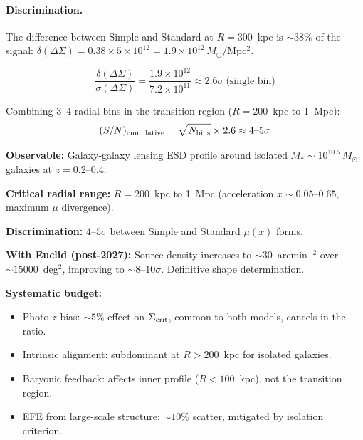 \documentclass[11pt,a4paper]{article}
\newcommand{\ee}[1]{\times 10^{#1}}
\begin{document}
\paragraph{Discrimination.}
The difference between Simple and Standard at $R = 300$~kpc is $\sim 38\%$
of the signal:
$\delta(\Delta\Sigma) = 0.38 \times 5\ee{12} = 1.9\ee{12}\,M_\odot/$Mpc$^2$.

\begin{equation}
\boxed{
\frac{\delta(\Delta\Sigma)}{\sigma(\Delta\Sigma)} = \frac{1.9\ee{12}}{7.2\ee{11}}
\approx 2.6\sigma \;\text{(single bin)}
}
\end{equation}

Combining 3--4 radial bins in the transition region ($R = 200$~kpc to 1~Mpc):
\begin{equation}
(S/N)_{\rm cumulative} = \sqrt{N_{\rm bins}} \times 2.6 \approx 4\text{--}5\sigma
\end{equation}

\begin{tcolorbox}[colback=green!5!white, colframe=green!50!black,
  title=\textbf{$\mu(x)$ Shape Test: $4$--$5\sigma$ with DES Y6 + DESI}]
\textbf{Observable:} Galaxy-galaxy lensing ESD profile around isolated
$M_* \sim 10^{10.5}\,M_\odot$ galaxies at $z = 0.2$--$0.4$.

\textbf{Critical radial range:} $R = 200$~kpc to 1~Mpc (acceleration
$x \sim 0.05$--$0.65$, maximum $\mu$ divergence).

\textbf{Discrimination:} $4$--$5\sigma$ between Simple and Standard
$\mu(x)$ forms.

\textbf{With Euclid (post-2027):} Source density increases to
$\sim 30$~arcmin$^{-2}$ over $\sim 15000$~deg$^2$, improving to
$\sim 8$--$10\sigma$.  Definitive shape determination.

\textbf{Systematic budget:}
\begin{itemize}
\item Photo-$z$ bias: $\sim 5\%$ effect on $\Sigma_{\rm crit}$, common to
  both models, cancels in the ratio.
\item Intrinsic alignment: subdominant at $R > 200$~kpc for isolated galaxies.
\item Baryonic feedback: affects inner profile ($R < 100$~kpc), not the
  transition region.
\item EFE from large-scale structure: $\sim 10\%$ scatter, mitigated by
  isolation criterion.
\end{itemize}
\end{tcolorbox}
\end{document}
